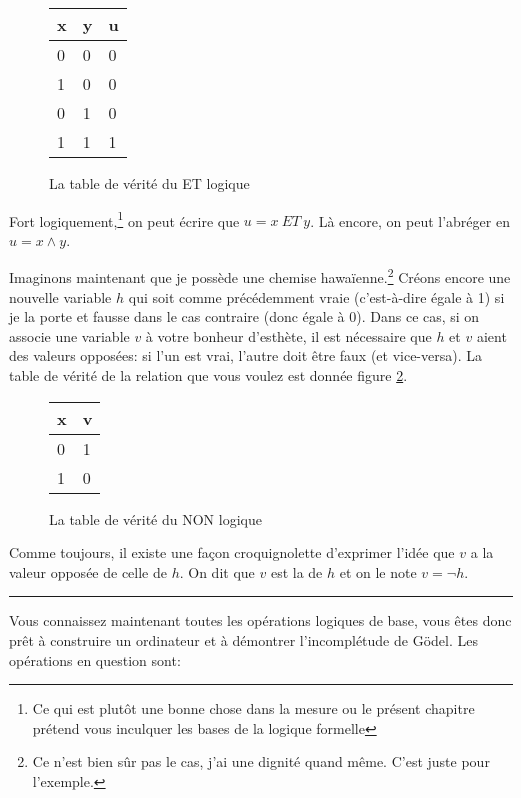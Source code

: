 \begin{figure}[ht]
  \centering
  \begin{tabular}{ll|l}
    x & y & u \\ \hline
    0 & 0 & 0 \\
    1 & 0 & 0 \\
    0 & 1 & 0 \\
    1 & 1 & 1 \\
  \end{tabular}
  \caption{La table de vérité du ET logique}
  \label{fig:table-et}
\end{figure}

Fort logiquement,\footnote{Ce qui est plutôt une bonne chose dans la
  mesure ou le présent chapitre prétend vous inculquer les bases de la
  logique formelle} on peut écrire que $u = x~ ET~ y$. Là encore, on
peut l'abréger en $u = x \land y$.

Imaginons maintenant que je possède une chemise hawaïenne.\footnote{Ce
  n'est bien sûr pas le cas, j'ai une dignité quand même. C'est juste
  pour l'exemple.} Créons encore une nouvelle variable $h$ qui soit
comme précédemment vraie (c'est-à-dire égale à 1) si je la porte et
fausse dans le cas contraire (donc égale à 0). Dans ce cas, si on
associe une variable $v$ à votre bonheur d'esthète, il est nécessaire
que $h$ et $v$ aient des valeurs opposées: si l'un est vrai, l'autre
doit être faux (et vice-versa). La table de vérité de la relation que
vous voulez est donnée figure \ref{fig:table-non}.

\begin{figure}[ht]
  \centering
  \begin{tabular}{l|l}
    x & v \\ \hline
    0 & 1 \\
    1 & 0 \\
  \end{tabular}
  \caption{La table de vérité du NON logique}
  \label{fig:table-non}
\end{figure}

Comme toujours, il existe une façon croquignolette d'exprimer l'idée
que $v$ a la valeur opposée de celle de $h$. On dit que $v$ est la
 de $h$ et on le note $v = \neg h$.

\plainbreak{2}

Vous connaissez maintenant toutes les opérations logiques de base,
vous êtes donc prêt à construire un ordinateur et à démontrer
l'incomplétude de Gödel. Les opérations en question sont:

